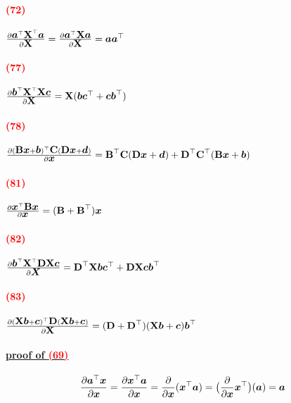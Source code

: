 \documentclass[12pt,oneside,english,a4paper]{article}
\newcommand{\parared}[1]{\paragraph{\Large\textcolor{red}{(#1)}}\Large}
\newcommand{\bsa}{\mbox{\boldmath $a$}}
\newcommand{\bsb}{\mbox{\boldmath $b$}}
\newcommand{\bsc}{\mbox{\boldmath $c$}}
\newcommand{\bsd}{\mbox{\boldmath $d$}}
\newcommand{\bsx}{\mbox{\boldmath $x$}}
\newcommand{\bsX}{\mbox{\boldmath $X$}}
\newcommand{\bfB}{\mbox{$\bf{B}$}}
\newcommand{\bfC}{\mbox{$\bf{C}$}}
\newcommand{\bfD}{\mbox{$\bf{D}$}}
\newcommand{\bfX}{\mbox{$\bf{X}$}}
\begin{document}
\parared{72} $\frac{\partial\bsa^\top\bfX^\top\bsa}{\partial\bfX}=\frac{\partial\bsa^\top\bfX\bsa}{\partial\bfX}=\bsa\bsa^\top$

\parared{77} $\frac{\partial\bsb^\top\bfX^\top\bfX\bsc}{\partial\bfX}=\bfX(\bsb\bsc^\top+\bsc\bsb^\top)$

\parared{78} $\frac{\partial(\bfB\bsx+\bsb)^\top\bfC(\bfD\bsx+\bsd)}{\partial \bsx}=\bfB^\top\bfC(\bfD\bsx+\bsd)+\bfD^\top\bfC^\top(\bfB\bsx+\bsb)$

\parared{81} $\frac{\partial\bsx^\top\bfB\bsx}{\partial \bsx}=(\bfB+\bfB^\top)\bsx$

\parared{82} $\frac{\partial\bsb^\top\bfX^\top\bfD\bfX\bsc}{\partial \bsX}=\bfD^\top\bfX\bsb\bsc^\top+\bfD\bfX\bsc\bsb^\top$

\parared{83} $\frac{\partial(\bfX\bsb+\bsc)^\top\bfD(\bfX\bsb+\bsc)}{\partial \bfX}=(\bfD+\bfD^\top)(\bfX\bsb+\bsc)\bsb^\top$

\paragraph{\Large\underline{proof of \textcolor{red}{(69)}}}
\[
\frac{\partial\bsa^\top\bsx}{\partial\bsx}=\frac{\partial\bsx^\top\bsa}{\partial\bsx}=\frac{\partial}{\partial\bsx}(\bsx^\top\bsa)=\big(\frac{\partial}{\partial\bsx}\bsx^\top\big)(\bsa)=\bsa
\]
\end{document}
